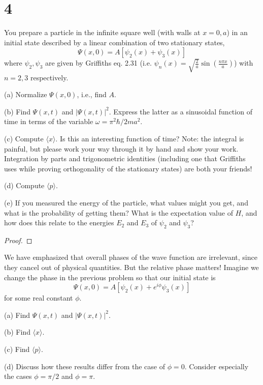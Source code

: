 \documentclass{article}
\begin{document}
\newpage

\section*{4}
\begin{ques}\label{q4}
You prepare a particle in the infinite square well (with walls at $x = 0, a$) in an initial state
described by a linear combination of two stationary states,
\[
\Psi(x, 0) = A[\psi_2(x) + \psi_3(x)]
\]
where $\psi_2, \psi_3$ are given by Griffiths eq. 2.31 (i.e. $\psi_n(x) = \sqrt{\frac{2}{a}}\sin\left(\frac{n\pi x}{a}\right)$) with $n = 2, 3$
respectively.

(a) Normalize $\Psi(x, 0)$, i.e., find $A$.

(b) Find $\Psi(x, t)$ and $|\Psi(x, t)|^2$. Express the latter as a sinusoidal function of time in
terms of the variable $\omega = \pi^2\hbar / 2ma^2$.

(c) Compute $\langle x \rangle$. Is this an interesting function of time? Note: the integral is painful,
but please work your way through it by hand and show your work. Integration by
parts and trigonometric identities (including one that Griffiths uses while proving
orthogonality of the stationary states) are both your friends!

(d) Compute $\langle p \rangle$.

(e) If you measured the energy of the particle, what values might you get, and what is
the probability of getting them? What is the expectation value of $H$, and how does
this relate to the energies $E_2$ and $E_3$ of $\psi_2$ and $\psi_3$?
\end{ques}

\begin{proof}
\end{proof}

\newpage

\begin{ques}\label{q5}
We have emphasized that overall phases of the wave function are irrelevant, since they
cancel out of physical quantities. But the relative phase matters! Imagine we change the
phase in the previous problem so that our initial state is
\[
\Psi(x, 0) = A[\psi_2(x) + e^{i\phi}\psi_3(x)]
\]
for some real constant $\phi$.

(a) Find $\Psi(x, t)$ and $|\Psi(x, t)|^2$.

(b) Find $\langle x \rangle$.

(c) Find $\langle p \rangle$.

(d) Discuss how these results differ from the case of $\phi = 0$. Consider especially the cases
$\phi = \pi/2$ and $\phi = \pi$.
\end{ques}
\end{document}
